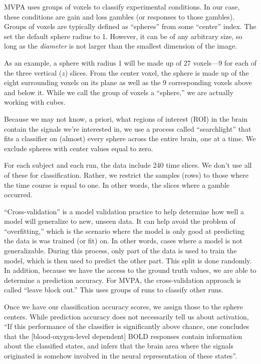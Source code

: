 \documentclass[11pt]{article}
\begin{document}
MVPA uses groups of voxels to classify experimental conditions. In our case,
these conditions are gain and loss gambles (or responses to those gambles).
Groups of voxels are typically defined as ``spheres'' from some ``center''
index. The set the default sphere radius to 1. However, it can be of any
arbitrary size, so long as the \textit{diameter} is not larger than the
smallest dimension of the image.

As an example, a sphere with radius 1 will be made up of 27 voxels---9
for each of the three vertical (\(z\)) slices. From the center voxel, the
sphere is made up of the eight surrounding voxels on its plane as well as the
9 corresponding voxels above and below it. While we call the group of voxels a
``sphere,'' we are actually working with cubes.

Because we may not know, a priori, what regions of interest (ROI) in the brain
contain the signals we're interested in, we use a process called
``searchlight'' that fits a classifier on (almost) every sphere across the
entire brain, one at a time. We exclude spheres with center values equal to
zero.

For each subject and each run, the data include 240 time slices. We don't use
all of these for classification. Rather, we restrict the samples (rows) to
those where the time course is equal to one. In other words, the slices where a
gamble occurred.

``Cross-validation'' is a model validation practice to help determine how well
a model will generalize to new, unseen data. It can help avoid the problem of
``overfitting,'' which is the scenario where the model is only good at
predicting the data is was trained (or fit) on. In other words, cases where a
model is not generalizable. During this process, only part of the data is used
to train the model, which is then used to predict the other part. This split is
done randomly. In addition, because we have the access to the ground truth
values, we are able to determine a prediction accuracy. For MVPA, the
cross-validation approach is called ``leave block out.'' This uses groups of
runs to classify other runs.

Once we have our classification accuracy scores, we assign those to the sphere
centers. While prediction accuracy does not necessarily tell us about
activation, ``If this performance of the classifier is significantly above
chance, one concludes that the [blood-oxygen-level dependent] BOLD responses
contain information about the classified states, and infers that the brain area
where the signals originated is somehow involved in the neural representation
of these states''\cite{schreiber2013statistical}.
\end{document}
